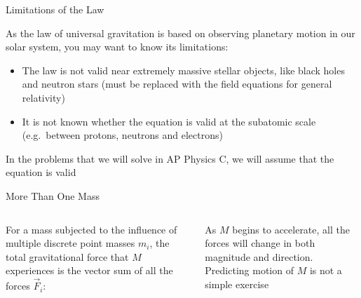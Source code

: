 \documentclass[12pt,compress,aspectratio=169]{beamer}
\begin{document}
\begin{frame}{Limitations of the Law}


  As the law of universal gravitation is based on observing planetary motion in
  our solar system, you may want to know its limitations:
  \begin{itemize}
  \item The law is not valid near extremely massive stellar objects, like black
    holes and neutron stars (must be replaced with the field equations for
    general relativity)
  \item It is not known whether the equation is valid at the subatomic scale
    (e.g.\ between protons, neutrons and electrons)
  \end{itemize}
  In the problems that we will solve in AP Physics C, we will assume that the
  equation is valid
\end{frame}


\begin{frame}{More Than One Mass}
  \begin{columns}

    For a mass subjected to the influence of multiple discrete point masses
    $m_i$, the total gravitational force that $M$ experiences is the vector sum
    of all the forces $\vec F_i$:
    

    As $M$ begins to accelerate, all the forces will change in both magnitude
    and direction. Predicting motion of $M$ is not a simple exercise
  \end{columns}
\end{frame}
\end{document}
